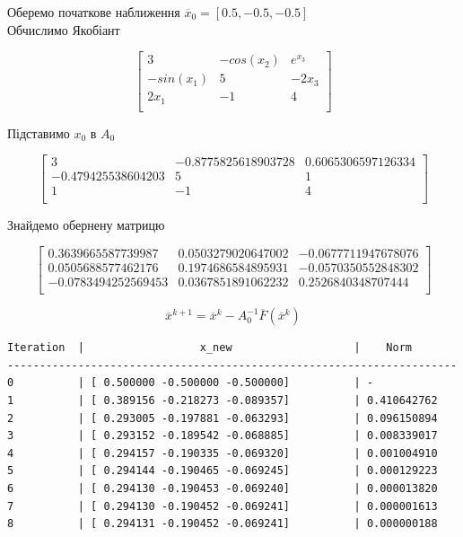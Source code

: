 \documentclass[a4paper, 12pt]{article}
\begin{document}
Оберемо початкове наближення \(\overline x_0 = [0.5, -0.5, -0.5]\) \\

Обчислимо Якобіант 

\begin{equation}
	\begin{bmatrix}
		3 & -cos(x_2) & e^{x_3} \\
		-sin(x_1) & 5 & -2 x_3 \\
		2 x_1 & -1 & 4 \\
	\end{bmatrix}
\end{equation}

Підставимо \(x_0\) в \(A_0\)

\begin{equation}
	\begin{bmatrix}
		3 & -0.8775825618903728 & 0.6065306597126334 \\ 
		-0.479425538604203 & 5 & 1 \\
		1 & -1 & 4  \\
	\end{bmatrix}
\end{equation}

Знайдемо обернену матрицю 

 \begin{equation}
	\begin{bmatrix}
		0.3639665587739987 &  0.0503279020647002 & -0.0677711947678076 \\
		0.0505688577462176 &  0.1974686584895931 & -0.0570350552848302 \\
		-0.0783494252569453 & 0.0367851891062232 &  0.2526840348707444 \\
	\end{bmatrix}
\end{equation}


\[ \overline x^{k+1} = \overline{x}^k - A^{-1}_0 \overline F(\overline x^k) \]


\begin{verbatim}
Iteration  |                  x_new                   |    Norm   
----------------------------------------------------------------------
0          | [ 0.500000 -0.500000 -0.500000]          | -
1          | [ 0.389156 -0.218273 -0.089357]          | 0.410642762
2          | [ 0.293005 -0.197881 -0.063293]          | 0.096150894
3          | [ 0.293152 -0.189542 -0.068885]          | 0.008339017
4          | [ 0.294157 -0.190335 -0.069320]          | 0.001004910
5          | [ 0.294144 -0.190465 -0.069245]          | 0.000129223
6          | [ 0.294130 -0.190453 -0.069240]          | 0.000013820
7          | [ 0.294130 -0.190452 -0.069241]          | 0.000001613
8          | [ 0.294131 -0.190452 -0.069241]          | 0.000000188
\end{verbatim}
\end{document}
